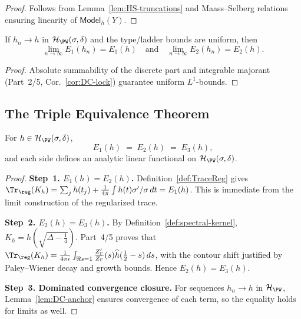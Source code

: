 \begin{proof}
Follows from Lemma~\ref{lem:HS-truncations} and Maass–Selberg relations ensuring linearity of \(\mathsf{Model}_h(Y)\). %
\end{proof}

\begin{lemma} \label{lem:DC-anchor} %
If \(h_n\to h\) in \(\mathcal H_{\PW}(\sigma,\delta)\) and the type/ladder bounds are uniform, then
\[
  \lim_{n\to\infty} E_1(h_n) = E_1(h)
  \quad\text{and}\quad
  \lim_{n\to\infty} E_2(h_n) = E_2(h).
\]
\end{lemma}

\begin{proof}
Absolute summability of the discrete part and integrable majorant (Part~2/5, Cor.~\ref{cor:DC-lock}) guarantee uniform \(L^1\)-bounds. %
\end{proof}

\subsection{The Triple Equivalence Theorem} \label{subsec:E1E2E3-theorem} %

\begin{theorem} \label{thm:E1E2E3} %
For \(h\in\mathcal H_{\PW}(\sigma,\delta)\),
\[
  E_1(h) \;=\; E_2(h) \;=\; E_3(h),
\]
and each side defines an analytic linear functional on \(\mathcal H_{\PW}(\sigma,\delta)\). %
\end{theorem}

\begin{proof}
\textbf{Step~1. \(E_1(h)=E_2(h)\).}  
Definition~\ref{def:TraceReg} gives
\(\Tr_{\reg}(K_h)=\sum_j h(t_j)+\frac{1}{4\pi}\int h(t)\sigma'/\sigma\,dt=E_1(h)\).
This is immediate from the limit construction of the regularized trace.

\textbf{Step~2. \(E_2(h)=E_3(h)\).}  
By Definition~\ref{def:spectral-kernel}, 
\(K_h=h(\sqrt{\Delta-\tfrac14})\).
Part~4/5 proves that
\(\Tr_{\reg}(K_h)=\frac{1}{4\pi i}\int_{\Re s=1}\frac{Z'_\Gamma}{Z_\Gamma}(s)\widehat{h}(\tfrac12-s)\,ds\),
with the contour shift justified by Paley–Wiener decay and growth bounds.
Hence \(E_2(h)=E_3(h)\).

\textbf{Step~3. Dominated convergence closure.}  
For sequences \(h_n\to h\) in \(\mathcal H_{\PW}\),
Lemma~\ref{lem:DC-anchor} ensures convergence of each term, so the equality holds for limits as well.
\end{proof}

